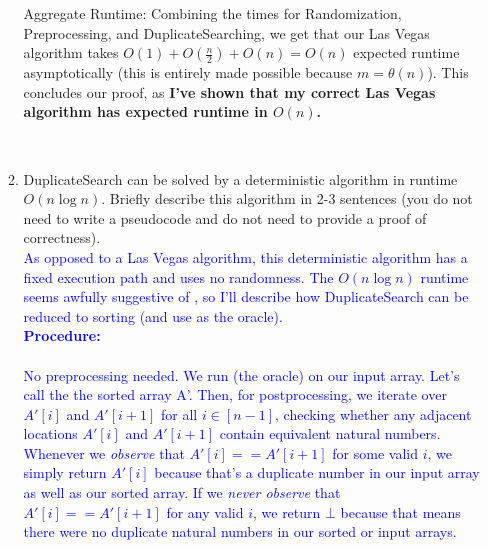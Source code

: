 \documentclass[11pt]{article}
\begin{document}
\begin{enumerate}
\begin{enumerate}
{\begin{enumerate}
\begin{enumerate}
        \end{enumerate}
    \end{enumerate}
    Aggregate Runtime: Combining the times for Randomization, Preprocessing, and DuplicateSearching, we get that our Las Vegas algorithm takes $O(1) + O(\frac{n}{2}) + O(n) = O(n)$ expected runtime asymptotically (this is entirely made possible because $m = \theta(n)$). This concludes our proof, as \textbf{I've shown that my correct Las Vegas algorithm has expected runtime in $O(n)$.}
} \\

    \item DuplicateSearch can be solved by a deterministic algorithm in runtime $O(n\log n)$. Briefly describe this algorithm in 2-3 sentences (you do not need to write a pseudocode and do not need to provide a proof of correctness). \\

\textcolor{blue}{
As opposed to a Las Vegas algorithm, this deterministic algorithm has a fixed execution path and uses no randomness. The $O(n\log n)$ runtime seems awfully suggestive of \MergeSort{}, so I'll describe how DuplicateSearch can be reduced to sorting (and use \MergeSort{} as the oracle).
} \\

\textcolor{blue}{
    \textbf{Procedure:} \\
    \\
    No preprocessing needed. We run \MergeSort{} (the oracle) on our input array. Let's call the the sorted array A'. Then, for postprocessing, we iterate over $A'[i]$ and $A'[i+1]$ for all $i \in [n-1]$, checking whether any adjacent locations $A'[i]$ and $A'[i+1]$ contain equivalent natural numbers. Whenever we \textit{observe} that $A'[i] == A'[i+1]$ for some valid $i$, we simply return $A'[i]$ because that's a duplicate number in our input array as well as our sorted array. If we \textit{never observe} that $A'[i] == A'[i+1]$ for any valid $i$, we return $\bot$ because that means there were no duplicate natural numbers in our sorted or input arrays.
} \\


\end{enumerate}
\end{enumerate}
\end{document}
